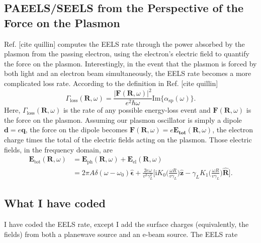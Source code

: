 \documentclass [11pt, proquest] {uwthesis}[2016/11/22]
\begin{document}
\subsection{PAEELS/SEELS from the Perspective of the Force on the Plasmon}

Ref. [cite quillin] computes the EELS rate through the power absorbed by the plasmon from the passing electron, using the electron's electric field to quantify the force on the plasmon. Interestingly, in the event that the plasmon is forced by both light and an electron beam simultaneously, the EELS rate becomes a more complicated loss rate. According to the definition in Ref. [cite quillin]
\begin{equation}
\Gamma_{\textrm{loss}}(\textbf{R},\omega) = \frac{|\textbf{F}(\textbf{R},\omega)|^2}{e^2\hbar\omega}\textrm{Im}\{\alpha_{\textrm{sp}}(\omega)\}.
\label{gamma_loss}
\end{equation}
Here, $\Gamma_{\textrm{loss}}(\textbf{R},\omega)$ is the rate of any possible energy-loss event and $\textbf{F}(\textbf{R},\omega)$ is the force on the plasmon. Assuming our plasmon oscillator is simply a dipole $\textbf{d}=e\textbf{q}$, the force on the dipole becomes $\textbf{F}(\textbf{R},\omega) = e\textbf{E}_{\textbf{tot}}(\textbf{R},\omega)$, the electron charge times the total of the electric fields acting on the plasmon. Those electric fields, in the frequency domain, are
\begin{equation}
\begin{aligned}
\textbf{E}_{\textrm{tot}}(\textbf{R},\omega) &= \textbf{E}_{\textrm{ph}}(\textbf{R},\omega) + \textbf{E}_{\textrm{el}}(\textbf{R},\omega)\\
& = 2\pi A\delta(\omega-\omega_0)\hat{\boldsymbol{\epsilon}} + \frac{2e\omega}{v^2\gamma_L^2}\big[ \textrm{i}K_0\big( \frac{\omega R}{v\gamma_L} \big)\hat{\textbf{z}} -  \gamma_L K_1\big( \frac{\omega R}{v\gamma_L} \big)\hat{\textbf{R}}\big].
\label{fields_sum}
\end{aligned}
\end{equation}






\subsection{What I have coded}

I have coded the EELS rate, except I add the surface charges (equivalently, the fields) from both a planewave source and an e-beam source. The EELS rate
\end{document}
